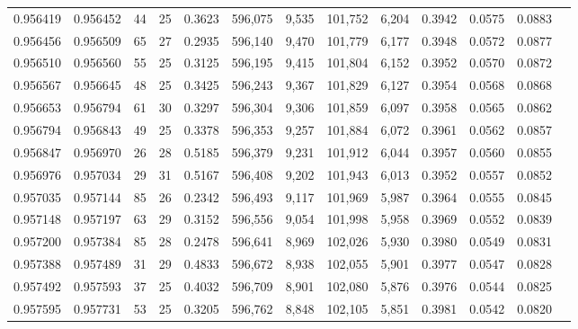\begin{tabular}{rrrrrrrrrrrrr}
0.956419 & 0.956452 &    44 &  25 &                                     0.3623 & 596,075 &   9,535 & 101,752 &   6,204 & 0.3942 & 0.0575 & 0.0883 \\
0.956456 & 0.956509 &    65 &  27 &                                     0.2935 & 596,140 &   9,470 & 101,779 &   6,177 & 0.3948 & 0.0572 & 0.0877 \\
0.956510 & 0.956560 &    55 &  25 &                                     0.3125 & 596,195 &   9,415 & 101,804 &   6,152 & 0.3952 & 0.0570 & 0.0872 \\
0.956567 & 0.956645 &    48 &  25 &                                     0.3425 & 596,243 &   9,367 & 101,829 &   6,127 & 0.3954 & 0.0568 & 0.0868 \\
0.956653 & 0.956794 &    61 &  30 &                                     0.3297 & 596,304 &   9,306 & 101,859 &   6,097 & 0.3958 & 0.0565 & 0.0862 \\
0.956794 & 0.956843 &    49 &  25 &                                     0.3378 & 596,353 &   9,257 & 101,884 &   6,072 & 0.3961 & 0.0562 & 0.0857 \\
0.956847 & 0.956970 &    26 &  28 &                                     0.5185 & 596,379 &   9,231 & 101,912 &   6,044 & 0.3957 & 0.0560 & 0.0855 \\
0.956976 & 0.957034 &    29 &  31 &                                     0.5167 & 596,408 &   9,202 & 101,943 &   6,013 & 0.3952 & 0.0557 & 0.0852 \\
0.957035 & 0.957144 &    85 &  26 &                                     0.2342 & 596,493 &   9,117 & 101,969 &   5,987 & 0.3964 & 0.0555 & 0.0845 \\
0.957148 & 0.957197 &    63 &  29 &                                     0.3152 & 596,556 &   9,054 & 101,998 &   5,958 & 0.3969 & 0.0552 & 0.0839 \\
0.957200 & 0.957384 &    85 &  28 &                                     0.2478 & 596,641 &   8,969 & 102,026 &   5,930 & 0.3980 & 0.0549 & 0.0831 \\
0.957388 & 0.957489 &    31 &  29 &                                     0.4833 & 596,672 &   8,938 & 102,055 &   5,901 & 0.3977 & 0.0547 & 0.0828 \\
0.957492 & 0.957593 &    37 &  25 &                                     0.4032 & 596,709 &   8,901 & 102,080 &   5,876 & 0.3976 & 0.0544 & 0.0825 \\
0.957595 & 0.957731 &    53 &  25 &                                     0.3205 & 596,762 &   8,848 & 102,105 &   5,851 & 0.3981 & 0.0542 & 0.0820 \\

\end{tabular}
